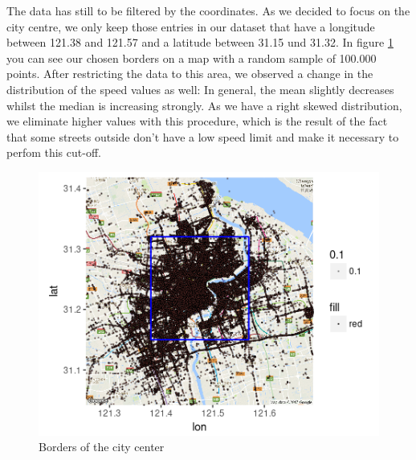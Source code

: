 \documentclass[11pt,conference,a4paper,onecolumn,romanappendices]{IEEEtran}
\begin{document}
The data has still to be filtered by the coordinates. As we decided to focus on the city centre, we only keep those entries in our dataset that have a longitude between 121.38 and 121.57 and a latitude between 31.15 und 31.32. In figure \ref{fig:borders} you can see our chosen borders on a map with a random sample of 100.000 points.  After restricting the data to this area, we observed a change in the distribution of the speed values as well: In general, the mean slightly decreases whilst the median is increasing strongly. As we have a right skewed distribution, we eliminate higher values with this procedure, which is the result of the fact that some streets outside don't have a low speed limit and make it necessary to perfom this cut-off. \\
\begin{figure}[h]
\centering
\includegraphics[scale=1]{borders.png}
\caption{\label{fig:borders}Borders of the city center}
\end{figure}
\end{document}
